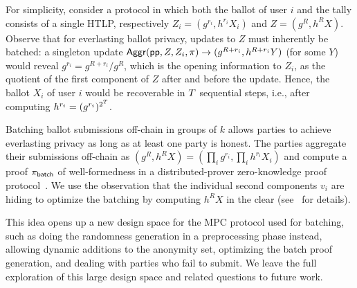 For simplicity, consider a protocol in which both the ballot of user $i$ and the tally consists of a single HTLP, respectively $Z_i=(g^{r_i},h^{r_i}X_i)$ and $Z = (g^R, h^R X)$. Observe that for everlasting ballot privacy, updates to $Z$ must inherently be batched: a singleton update $\mathsf{Aggr}(\mathsf{pp}, Z, Z_i, \pi) \to (g^{R+r_i}, h^{R+r_i} Y)$ (for some $Y$) would reveal $g^{r_i} = g^{R+r_i}/g^R$, which is the opening information to $Z_i$, as the quotient of the first component of $Z$ after and before the update. Hence, the ballot $X_i$ of user $i$ would be recoverable in $T$ sequential steps, i.e., after computing $h^{r_i}=(g^{r_i})^{2^{T}}$.

Batching ballot submissions off-chain in groups of $k$ allows parties to achieve everlasting privacy as long as at least one party is honest. 
The parties aggregate their submissions off-chain as $(g^R, h^R X) = (\prod_i g^{r_i}, \prod_i h^{r_i} X_i)$ and compute a proof $\pi_{\sf batch}$ of well-formedness in a distributed-prover zero-knowledge proof protocol~\cite{PoPETS:DPPSV22}. We use the observation that the individual second components $v_i$ are hiding to optimize the batching by computing $h^R X$ in the clear
(see~ for details).



This idea opens up a new design space for the MPC protocol used for batching, such as doing the randomness generation in a preprocessing phase instead, allowing dynamic additions to the anonymity set, optimizing the batch proof generation, and dealing with parties who fail to submit. We leave the full exploration of this large design space and related questions to future work.


